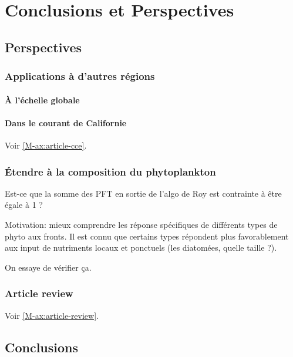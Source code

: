 \documentclass[index]{subfiles}
\begin{document}
\chapter{Conclusions et Perspectives}
\label{chp:conclusion}

\tocsubfile

\section{Perspectives}
\label{sec:perspectives}

\subsection{Applications à d'autres régions}
\label{sec:appl-autres-regions}

\subsubsection{À l'échelle globale}
\label{sec:global}

\subsubsection{Dans le courant de Californie}
\label{sec:CCE}

Voir \cref{M-ax:article-cce}.

\subsection{Étendre à la composition du phytoplankton}
\label{sec:persp-pft}

Est-ce que la somme des PFT en sortie de l'algo de Roy est contrainte à être égale à 1 ?

Motivation: mieux comprendre les réponse spécifiques de différents types de phyto aux fronts.
Il est connu que certains types répondent plus favorablement aux input de nutriments locaux et ponctuels (les diatomées, quelle taille ?).

On essaye de vérifier ça.

\subsection{Article review}
Voir \cref{M-ax:article-review}.

\section{Conclusions}
\label{sec:conclusions}
\end{document}
